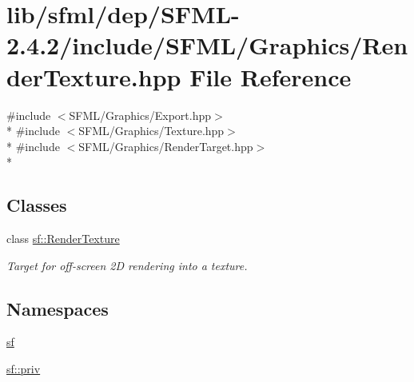 \hypertarget{sfml_2dep_2_s_f_m_l-2_84_82_2include_2_s_f_m_l_2_graphics_2_render_texture_8hpp}{\section{lib/sfml/dep/\-S\-F\-M\-L-\/2.4.2/include/\-S\-F\-M\-L/\-Graphics/\-Render\-Texture.hpp File Reference}
\label{sfml_2dep_2_s_f_m_l-2_84_82_2include_2_s_f_m_l_2_graphics_2_render_texture_8hpp}
}
{\ttfamily \#include $<$S\-F\-M\-L/\-Graphics/\-Export.\-hpp$>$}\\*
{\ttfamily \#include $<$S\-F\-M\-L/\-Graphics/\-Texture.\-hpp$>$}\\*
{\ttfamily \#include $<$S\-F\-M\-L/\-Graphics/\-Render\-Target.\-hpp$>$}\\*
\subsection*{Classes}
\begin{DoxyCompactItemize}
\item 
class \hyperlink{classsf_1_1_render_texture}{sf\-::\-Render\-Texture}
\begin{DoxyCompactList}\small\item\em Target for off-\/screen 2\-D rendering into a texture. \end{DoxyCompactList}\end{DoxyCompactItemize}
\subsection*{Namespaces}
\begin{DoxyCompactItemize}
\item 
\hyperlink{namespacesf}{sf}
\item 
\hyperlink{namespacesf_1_1priv}{sf\-::priv}
\end{DoxyCompactItemize}
